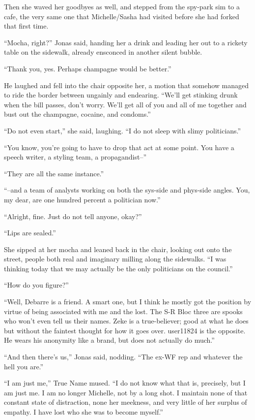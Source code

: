 Then she waved her goodbyes as well, and stepped from the spy-park sim to a cafe, the very same one that Michelle/Sasha had visited before she had forked that first time.

``Mocha, right?'' Jonas said, handing her a drink and leading her out to a rickety table on the sidewalk, already ensconced in another silent bubble.

``Thank you, yes. Perhaps champagne would be better.''

He laughed and fell into the chair opposite her, a motion that somehow managed to ride the border between ungainly and endearing. ``We'll get stinking drunk when the bill passes, don't worry. We'll get all of you and all of me together and bust out the champagne, cocaine, and condoms.''

``Do not even start,'' she said, laughing. ``I do not sleep with slimy politicians.''

``You know, you're going to have to drop that act at some point. You have a speech writer, a styling team, a propagandist--''

``They are all the same instance.''

``--and a team of analysts working on both the sys-side and phys-side angles. You, my dear, are one hundred percent a politician now.''

``Alright, fine. Just do not tell anyone, okay?''

``Lips are sealed.''

She sipped at her mocha and leaned back in the chair, looking out onto the street, people both real and imaginary milling along the sidewalks. ``I was thinking today that we may actually be the only politicians on the council.''

``How do you figure?''

``Well, Debarre is a friend. A smart one, but I think he mostly got the position by virtue of being associated with me and the lost. The S-R Bloc three are spooks who won't even tell us their names. Zeke is a true-believer; good at what he does but without the faintest thought for how it goes over. user11824 is the opposite. He wears his anonymity like a brand, but does not actually do much.''

``And then there's us,'' Jonas said, nodding. ``The ex-WF rep and whatever the hell you are.''

``I am just me,'' True Name mused. ``I do not know what that is, precisely, but I am just me. I am no longer Michelle, not by a long shot. I maintain none of that constant state of distraction, none her meekness, and very little of her surplus of empathy. I have lost who she was to become myself.''

